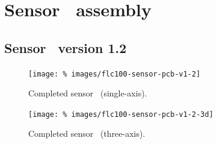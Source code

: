 \chapter[Sensor PCB assembly]{Sensor \pcb\ assembly}

\section[Sensor PCB version 1.2]{Sensor \pcb\ version 1.2}

\begin{figure}
  \centering
  \texttt{[image: \%
    images/flc100-sensor-pcb-v1-2]}
  \caption[Completed sensor PCB (single-axis)]{%
    Completed sensor \pcb\ (single-axis). %
    }
  \label{fig:sensor-pcb-v1.2}
\end{figure}
\begin{figure}
  \centering
  \texttt{[image: \%
    images/flc100-sensor-pcb-v1-2-3d]}
  \caption[Completed sensor PCB (three-axis)]{%
    Completed sensor \pcb\ (three-axis). %
    }
  \label{fig:sensor-pcb-v1.2-3d}
\end{figure}

